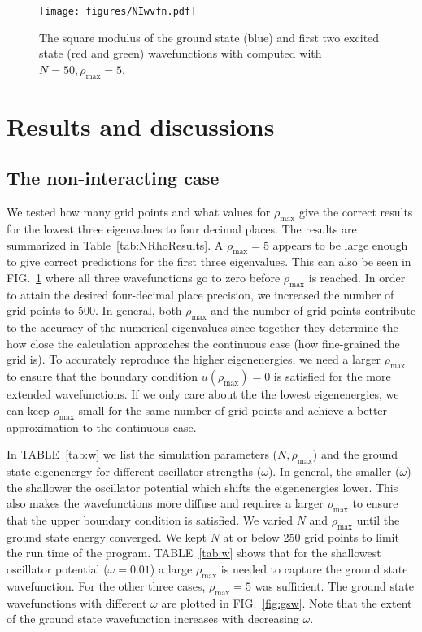 \documentclass[10pt,showpacs,preprintnumbers,footinbib,amsmath,amssymb,aps,prl,twocolumn,groupedaddress,superscriptaddress,showkeys]{revtex4-1}
\newcommand{\rhomax}{
	\ensuremath{ \rho _{\mathrm{max}}} }
\begin{document}
{\begin{figure}
\centering
	\texttt{[image: figures/NIwvfn.pdf]}
	\caption{The square modulus of the ground state (blue) and first two excited state (red and
	green) wavefunctions with computed with $N=50, \rhomax=5$.}
	\label{fig:NIwvfn}
\end{figure}


\section{Results and discussions}

\subsection{The non-interacting case}

We tested how many grid points and what values for \rhomax give
the correct results for the lowest three eigenvalues to four decimal places.
The results are summarized in Table~\ref{tab:NRhoResults}. A
$\rhomax = 5$ appears to be large enough to give correct predictions
for the first three eigenvalues. This can also be seen in FIG.~\ref{fig:NIwvfn}
where all three wavefunctions go to zero before \rhomax is reached.
In order to attain the desired four-decimal
place precision, we increased the number of grid points to 500. In general,
both \rhomax and the number of grid points contribute to the accuracy of
the numerical eigenvalues since together they determine the how close
the calculation approaches the continuous case (how fine-grained the grid is).
To accurately reproduce the higher
eigenenergies, we need a larger \rhomax to ensure that the boundary
condition $u(\rhomax)=0$ is satisfied for the more extended
wavefunctions. If we only care about the the
lowest eigenenergies, we can keep \rhomax small for the same number
of grid points and achieve a better approximation to the continuous
case.

In TABLE~\ref{tab:w} we list the simulation parameters ($N,\rhomax$)
and the ground state eigenenergy for different oscillator strengths ($\omega$).
In general, the smaller ($\omega$) the shallower the oscillator potential which
shifts the eigenenergies lower. This also makes the wavefunctions more diffuse
and requires a larger \rhomax to ensure that the upper boundary condition is
satisfied. We varied $N$ and \rhomax until the ground state energy converged.
We kept $N$ at or below 250 grid points to limit the run time of the program.
TABLE~\ref{tab:w} shows that for the shallowest oscillator potential ($\omega = 0.01$)
a large \rhomax is needed to capture the ground state wavefunction. For the
other three cases, $\rhomax=5$ was sufficient. The ground state wavefunctions
with different $\omega$ are plotted in FIG.~\ref{fig:gsw}. Note that the extent of
the ground state wavefunction increases with decreasing $\omega$.

}
\end{document}
